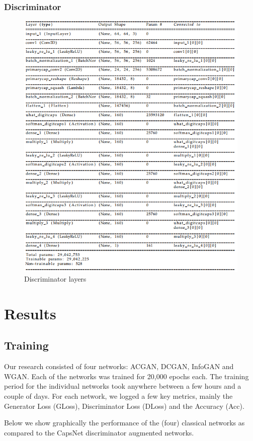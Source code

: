 \documentclass{vldb}
\begin{document}
\subsubsection{Discriminator} %
\label{sub:Discriminator}
\begin{figure}[H]
\centering\includegraphics[width=\linewidth]{../Final_Report/images/discriminator_layers.png}
\caption{Discriminator layers}
\label{fig:discriminator_layers}
\end{figure} 

\section{Results}
\subsection{Training} %
\label{sec:training}

Our research consisted of four networks: ACGAN, DCGAN, InfoGAN and WGAN. Each of the networks was trained for 20,000 epochs each. The training period for the individual networks took anywhere between a few hours and a couple of days. For each network, we logged a few key metrics, mainly the Generator Loss (GLoss), Discriminator Loss (DLoss) and the Accuracy (Acc). 
\par\bigskip
Below we show graphically the performance of the (four) classical networks as compared to the CapsNet discriminator augmented networks.
\end{document}
